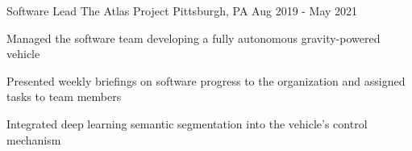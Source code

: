 

\begin{cventries}

  \cventry
    {Software Lead} %
    {The Atlas Project} %
    {Pittsburgh, PA} %
    {Aug 2019 - May 2021} %
    {
      \begin{cvitems} %
		\item Managed the software team developing a fully autonomous gravity-powered vehicle
		\item Presented weekly briefings on software progress to the organization and assigned tasks to team members
		\item Integrated deep learning semantic segmentation into the vehicle's control mechanism
      \end{cvitems}
    }


\end{cventries}
